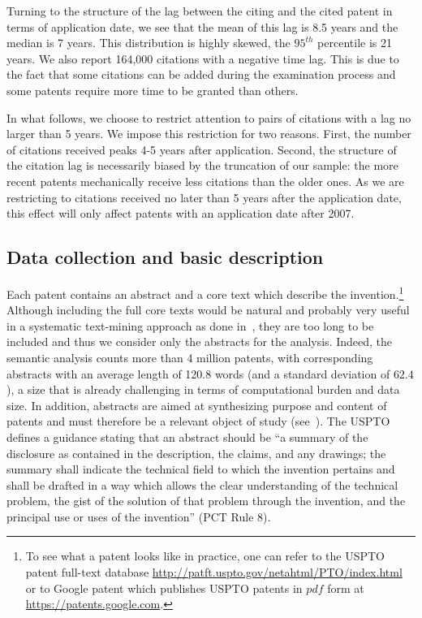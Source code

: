 \documentclass[12pt,twoside,a4paper]{article}
\begin{document}
Turning to the structure of the lag between the citing and the cited patent in terms of application date, we see that the mean of this lag is 8.5 years and the median is 7 years. This distribution is highly skewed, the $95^{th}$ percentile is 21 years. We also report 164,000 citations with a negative time lag. This is due to the fact that some citations can be added during the examination process and some patents require more time to be granted than others.

In what follows, we choose to restrict attention to pairs of citations with a lag no larger than 5 years. We impose this restriction for two reasons. First, the number of citations received peaks 4-5 years after application. Second, the structure of the citation lag is necessarily biased by the truncation of our sample: the more recent patents mechanically receive less citations than the older ones. As we are restricting to citations received no later than 5 years after the application date, this effect will only affect patents with an application date after 2007.

\subsection{Data collection and basic description}
Each patent contains an abstract and a core text which describe the invention.\footnote{To see what a patent looks like in practice, one can refer to the USPTO patent full-text database \url{http://patft.uspto.gov/netahtml/PTO/index.html} or to Google patent which publishes USPTO patents in $pdf$ form at \url{https://patents.google.com}.} Although including the full core texts would be natural and probably very useful in a systematic text-mining approach as done in~\cite{tseng2007text}, they are too long to be included and thus we consider only the abstracts for the analysis. Indeed, the semantic analysis counts more than 4 million patents, with corresponding abstracts with an average length of 120.8 words (and a standard deviation of $62.4$), a size that is already challenging in terms of computational burden and data size. In addition, abstracts are aimed at synthesizing purpose and content of patents and must therefore be a relevant object of study (see~\cite{Adams2010text}). The USPTO defines a guidance stating that an abstract should be ``a summary of the disclosure as contained in the description, the claims, and any drawings; the summary shall indicate the technical field to which the invention pertains and shall be drafted in a way which allows the clear understanding of the technical problem, the gist of the solution of that problem through the invention, and the principal use or uses of the invention'' (PCT Rule 8). 
\end{document}
